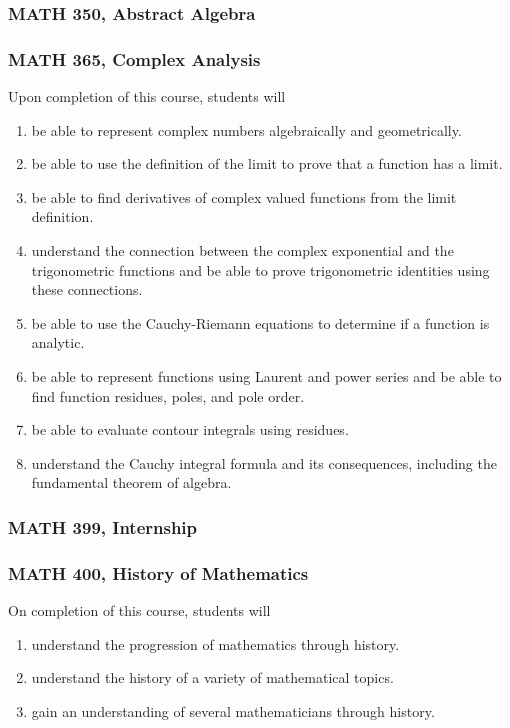 \documentclass[11pt]{article}
\newenvironment{alphalist}{
\begin{enumerate}[label=(\arabic*),widest=107 ,leftmargin=25pt, itemsep=0pt]}
{\end{enumerate}}
\begin{document}
\subsubsection*{MATH 350,  Abstract Algebra}

\subsubsection*{MATH 365, Complex Analysis}

Upon completion of this course, students will 
\begin{alphalist}
    \item be able to represent complex numbers algebraically and geometrically.
    \item be able to use the definition of the limit to prove that a function has a limit.
    \item be able to find derivatives of complex valued functions from the limit definition.
    \item understand the connection between the complex exponential and the trigonometric functions and be able to 
        prove trigonometric identities using these connections.
    \item be able to use the Cauchy-Riemann equations to determine if a function is 
          analytic.
    \item be able to represent functions using Laurent and power series and be able 
           to find function residues, poles, and pole order.
    \item be able to evaluate contour integrals using residues.
    \item understand the Cauchy integral formula and its consequences,  including the 
       fundamental theorem of algebra.
\end{alphalist}





\subsubsection*{MATH 399, Internship}


\subsubsection*{MATH 400, History of Mathematics}

On completion of this course, students will 
\begin{alphalist}
    \item understand the progression of mathematics through history.
    \item understand the history of a variety of mathematical topics.
    \item gain an understanding of several mathematicians through history.
\end{alphalist}
\end{document}
